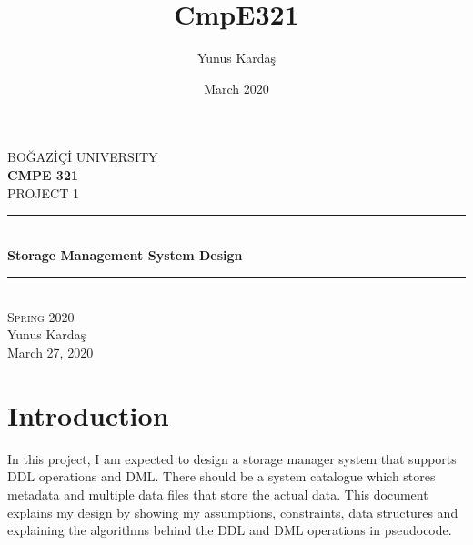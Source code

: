\documentclass[12pt,a4paper]{article}
\title{CmpE321}
\author{Yunus Kardaş}
\date{March 2020}
\begin{document}
\begin{titlepage}

\newcommand{\HRule}{\rule{\linewidth}{0.5mm}}

\center %


\textsc{\LARGE BOĞAZİÇİ UNIVERSITY}\\[1.5cm] %
\textbf{\Large CMPE 321}\\[0.5cm] %
\textsc{\large PROJECT 1}\\[2cm] %



\HRule \\[0.4cm]
{ \huge \bfseries Storage Management System Design}\\[0.3cm] %
\HRule \\[4cm]

\textsc{\large Spring 2020}\\[0.5cm] %
\Large Yunus Kardaş \\ [3cm] %


{\large March 27, 2020}\\[2cm] %
\vfill %
\end{titlepage}

\tableofcontents{}

\break

\section{Introduction}
    In this project, I am expected to design a storage manager system that supports DDL operations and DML. There should be a system catalogue which stores metadata and multiple data files that store the actual data. This document explains my design by showing my assumptions, constraints, data structures and explaining the algorithms behind the DDL and DML operations in pseudocode.  
\end{document}
